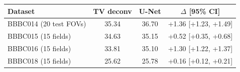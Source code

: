 \begin{tabular}{lccc}
\toprule
Dataset & TV deconv & U-Net & $\Delta$ [95\% CI] \\
\midrule
BBBC014 (20 test FOVs) & 35.34 & 36.70 & +1.36 [+1.23, +1.49] \\
BBBC015 (15 fields) & 34.63 & 35.15 & +0.52 [+0.35, +0.68] \\
BBBC016 (15 fields) & 33.81 & 35.10 & +1.30 [+1.22, +1.37] \\
BBBC018 (15 fields) & 25.62 & 25.78 & +0.16 [+0.12, +0.21] \\
\bottomrule
\end{tabular}
